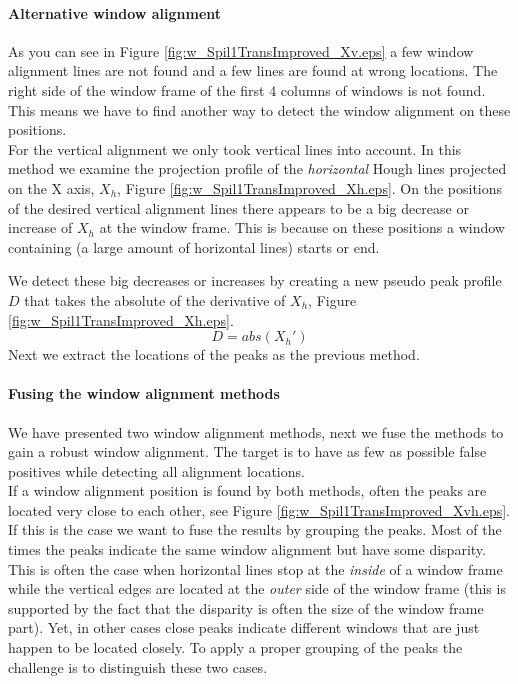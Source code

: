 \paragraph{Alternative window alignment}
As you can see in Figure \ref{fig:w_Spil1TransImproved_Xv.eps}
a few window alignment lines are not found and a few lines are found at wrong locations.
The right side of the window frame of the first 4 columns of windows is not found.
This means we have to find another way to detect the window alignment on these positions.\\

For the vertical alignment we only took vertical lines into account.
In this method we examine the projection profile of the \emph{horizontal} Hough lines
projected on the X axis, $X_h$, Figure \ref{fig:w_Spil1TransImproved_Xh.eps}.
On the positions of the desired vertical alignment lines there appears to be a 
big decrease or increase of $X_h$ at the window frame. This is because on these
positions a window containing (a large amount of horizontal lines) starts or end.

We detect these big decreases or increases by creating a new pseudo peak profile
$D$ that takes the absolute of the derivative of $X_h$, Figure \ref{fig:w_Spil1TransImproved_Xh.eps}.
\[D = abs( X_{h}')\]
Next we extract the locations of the peaks as the previous method.

\paragraph{Fusing the window alignment methods}
We have presented two window alignment methods, next we fuse the methods to
gain a robust window alignment.
The target is to have as few as possible false positives while detecting all alignment locations.\\

If a window alignment position is found by both methods, often the peaks are
located very close to each other, see Figure
\ref{fig:w_Spil1TransImproved_Xvh.eps}.  If this is the case we want to fuse the results by grouping the peaks.
Most of the times the peaks indicate the same window alignment but have
some disparity.  This is often the case when horizontal lines stop at the \emph{inside}
of a window frame while the vertical edges are located at the \emph{outer} side of the
window frame (this is supported by the fact that the disparity is often the size of the window frame part).  
Yet, in other cases close peaks indicate different windows that are just happen to be
located closely.  To apply a proper grouping of the peaks the challenge is to
distinguish these two cases.\\

